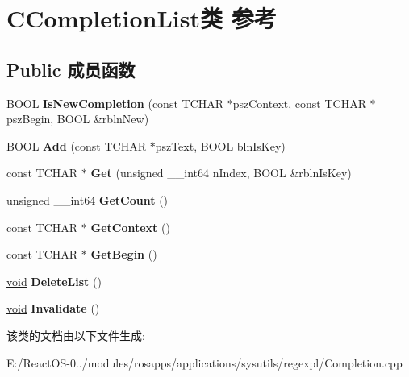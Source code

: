 \hypertarget{class_c_completion_list}{}\section{C\+Completion\+List类 参考}
\label{class_c_completion_list}
\subsection*{Public 成员函数}
\begin{DoxyCompactItemize}
\item 
\mbox{\label{class_c_completion_list_a262e62bff01f2b66ef5d69c514c7ab55}} 
B\+O\+OL {\bfseries Is\+New\+Completion} (const T\+C\+H\+AR $\ast$psz\+Context, const T\+C\+H\+AR $\ast$psz\+Begin, B\+O\+OL \&rbln\+New)
\item 
\mbox{\label{class_c_completion_list_a219850ed1ec581d87aa1c3bdc379d2f0}} 
B\+O\+OL {\bfseries Add} (const T\+C\+H\+AR $\ast$psz\+Text, B\+O\+OL bln\+Is\+Key)
\item 
\mbox{\label{class_c_completion_list_a35db055ad92c4762c1ce2ed35f3ce631}} 
const T\+C\+H\+AR $\ast$ {\bfseries Get} (unsigned \+\_\+\+\_\+int64 n\+Index, B\+O\+OL \&rbln\+Is\+Key)
\item 
\mbox{\label{class_c_completion_list_a69edca01c86aa226736307dbe515e161}} 
unsigned \+\_\+\+\_\+int64 {\bfseries Get\+Count} ()
\item 
\mbox{\label{class_c_completion_list_ad898d1aa05309b6a6a9d0b06b65a3b5c}} 
const T\+C\+H\+AR $\ast$ {\bfseries Get\+Context} ()
\item 
\mbox{\label{class_c_completion_list_a2d75a2bc458b276275868eef76acf988}} 
const T\+C\+H\+AR $\ast$ {\bfseries Get\+Begin} ()
\item 
\mbox{\label{class_c_completion_list_a3bc7c95647bdb3f25285ef95238abd1e}} 
\hyperlink{interfacevoid}{void} {\bfseries Delete\+List} ()
\item 
\mbox{\label{class_c_completion_list_ac072af080895590aaea4ea3f723e050e}} 
\hyperlink{interfacevoid}{void} {\bfseries Invalidate} ()
\end{DoxyCompactItemize}


该类的文档由以下文件生成\+:\begin{DoxyCompactItemize}
\item 
E\+:/\+React\+O\+S-\/0../modules/rosapps/applications/sysutils/regexpl/Completion.\+cpp\end{DoxyCompactItemize}
